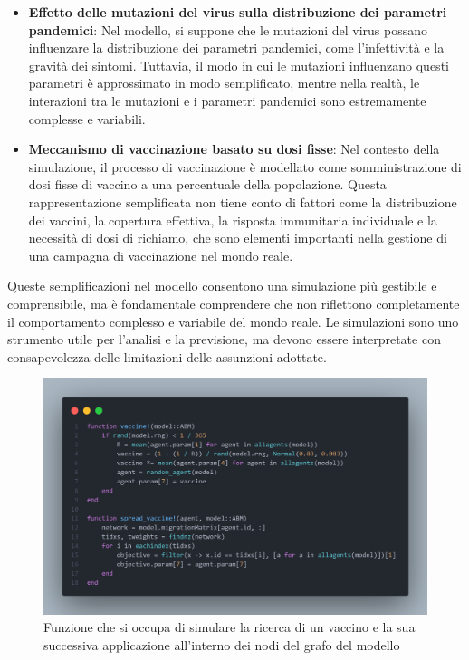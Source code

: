 \begin{itemize}
	\item \textbf{Effetto delle mutazioni del virus sulla distribuzione
	dei parametri pandemici}: Nel modello, si suppone che le mutazioni 
	del virus possano influenzare la distribuzione dei parametri 
	pandemici, come l'infettività e la gravità dei sintomi. 
	Tuttavia, il modo in cui le mutazioni influenzano questi parametri 
	è approssimato in modo semplificato, mentre nella realtà, 
	le interazioni tra le mutazioni e i parametri pandemici sono 
	estremamente complesse e variabili.
	\item \textbf{Meccanismo di vaccinazione basato su dosi fisse}: Nel 
	contesto della simulazione, il processo di vaccinazione è modellato 
	come somministrazione di dosi fisse di vaccino a una percentuale 
	della popolazione. Questa rappresentazione semplificata non tiene 
	conto di fattori come la distribuzione dei vaccini, la copertura 
	effettiva, la risposta immunitaria individuale e la necessità di 
	dosi di richiamo, che sono elementi importanti nella gestione di 
	una campagna di vaccinazione nel mondo reale.
\end{itemize}

Queste semplificazioni nel modello consentono una simulazione più 
gestibile e comprensibile, ma è fondamentale comprendere che non 
riflettono completamente il comportamento complesso e variabile 
del mondo reale. Le simulazioni sono uno strumento utile per l'analisi 
e la previsione, ma devono essere interpretate con consapevolezza delle 
limitazioni delle assunzioni adottate.

\begin{figure}[H]
    \begin{center}
		\includegraphics[width=\textwidth]{img/vaccine.png}
		\caption{Funzione che si occupa di simulare la ricerca di un vaccino e la sua successiva applicazione all'interno dei nodi del grafo del modello}
		\label{fig:vaccine}
	\end{center}
\end{figure}
